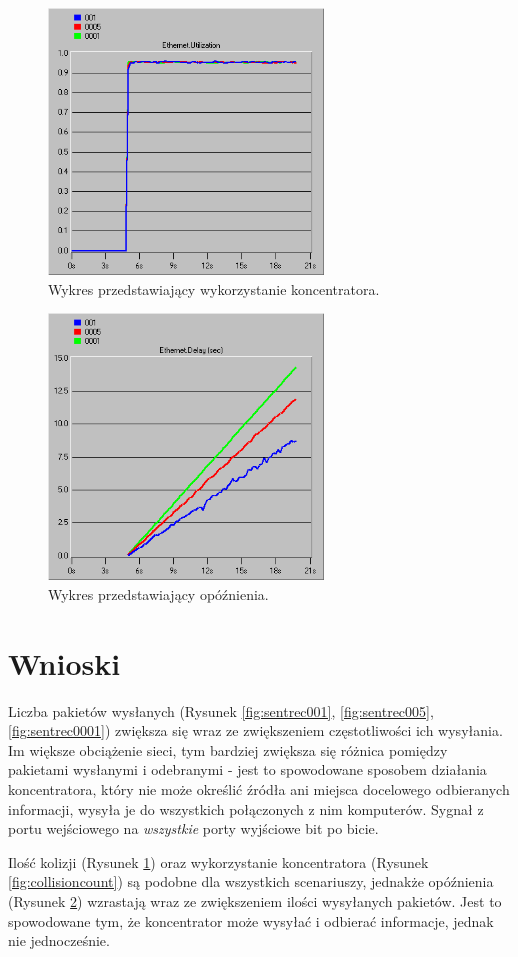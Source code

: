 \documentclass{article}
\begin{document}
\begin{figure}[H]
  \centering
  \includegraphics[width=0.65\textwidth]{screens/samo/koncentrator_utilization.png}
  \caption{Wykres przedstawiający wykorzystanie koncentratora.}
  \label{fig:utilization}
\end{figure}


\begin{figure}[H]
  \centering
  \includegraphics[width=0.65\textwidth]{screens/samo/delay.png}
  \caption{Wykres przedstawiający opóźnienia.}
  \label{fig:delay}
\end{figure}

\section{Wnioski}
Liczba pakietów wysłanych (Rysunek \ref{fig:sentrec001}, \ref{fig:sentrec005}, \ref{fig:sentrec0001}) zwiększa się wraz ze zwiększeniem częstotliwości ich wysyłania. Im większe obciążenie sieci, tym bardziej zwiększa się różnica pomiędzy pakietami wysłanymi i odebranymi - jest to spowodowane sposobem działania koncentratora, który nie może określić źródła ani miejsca docelowego odbieranych informacji, wysyła je do wszystkich połączonych z nim komputerów. Sygnał z portu wejściowego na \emph{wszystkie} porty wyjściowe bit po bicie.

Ilość kolizji (Rysunek \ref{fig:utilization}) oraz wykorzystanie koncentratora (Rysunek \ref{fig:collisioncount}) są podobne dla wszystkich scenariuszy, jednakże opóźnienia (Rysunek \ref{fig:delay}) wzrastają wraz ze zwiększeniem ilości wysyłanych pakietów. Jest to spowodowane tym, że koncentrator może wysyłać i odbierać informacje, jednak nie jednocześnie.
\end{document}
